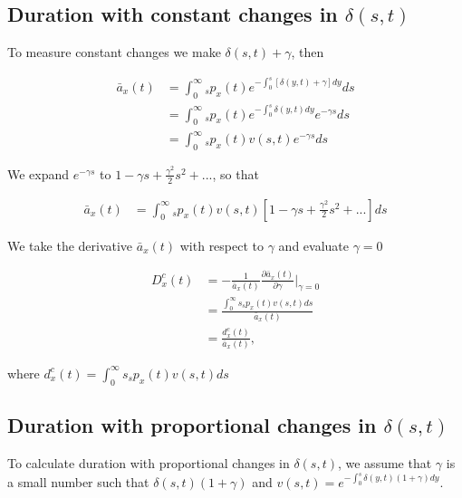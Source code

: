 \documentclass[12pt]{article}
\begin{document}
\subsection{Duration with constant changes in $\delta(s,t)$}

To measure constant changes we make $\delta(s,t)+\gamma$, then

\begin{equation}\label{eq:DurationConst1}
\begin{split}
\bar{a}_{x}(t) &= \int_0^\infty {}_sp_x(t) e^{- \int_{0}^{s} [\delta(y,t)+\gamma]dy}ds \\
&= \int_0^\infty {}_sp_x(t) e^{- \int_{0}^{s}\delta(y,t)dy}e^{-\gamma s}ds \\
&= \int_0^\infty {}_sp_x(t) {v}(s,t)e^{-\gamma s}ds
\end{split}
\end{equation}

We expand $e^{-\gamma s}$ to $1-\gamma s+\frac{\gamma^2}{2} s^{2} +...$, so that


\begin{equation}\label{eq:DurationConst1}
\begin{split}
\bar{a}_{x}(t) &= \int_0^\infty {}_sp_x(t) {v}(s,t)[1-\gamma s+\frac{\gamma^2}{2} s^{2} +...]ds
\end{split}
\end{equation}

We take the derivative $\bar{a}_{x}(t)$ with respect to $\gamma$ and evaluate $\gamma=0$


\begin{equation}\label{eq:DurationConst2}
\begin{split}
{D}^{c}_x(t)&=-\frac{1}{\bar{a}_x(t)}\frac{\partial \bar{a}_x(t)}{\partial \gamma} \bigg\rvert_{\gamma=0}\\
              &= \frac{\int_0^\infty s {}_sp_x(t) {v}(s,t)ds}{\bar{a}_x(t)} \\
              &= \frac{{d}^{c}_x(t)}{\bar{a}_x(t)},
\end{split}
\end{equation}

where ${d}^{c}_x(t)=\int_0^\infty s {}_sp_x(t) {v}(s,t)ds$



\subsection{Duration with proportional changes in $\delta(s,t)$}

To calculate duration with proportional changes in $\delta(s,t)$, we assume that $\gamma$ is a small number such that $\delta(s,t)(1+\gamma)$ and  ${v}(s,t)=e^{-\int_0^{s}  \delta(y,t)(1+\gamma)dy}$.
\end{document}
